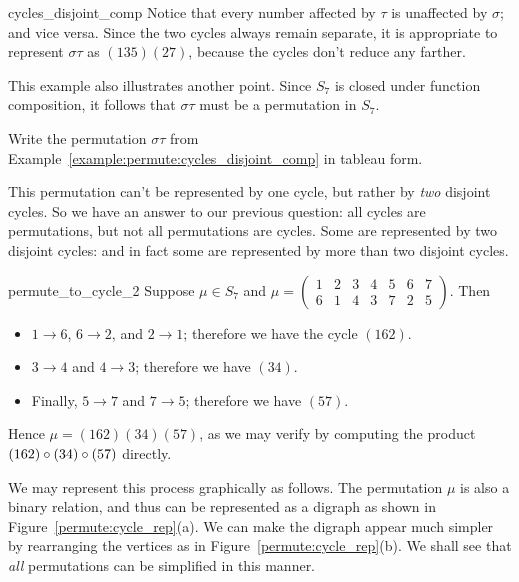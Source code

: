 \begin{example}{cycles_disjoint_comp}
Notice that every number affected by $\tau$ is unaffected by $\sigma$; and vice versa. Since the two cycles always  remain separate, it is appropriate to represent $\sigma \tau$ as $(135)(27)$, because the cycles don't reduce any farther.
\end{example}

This example also illustrates another point.  Since $S_7$ is closed under function composition, it follows that $\sigma \tau$ must be a permutation in $S_7$.

\begin{exercise}{}
Write the permutation $\sigma \tau$ from Example~\ref{example:permute:cycles_disjoint_comp} in tableau form.
\end{exercise}

This permutation can't be represented by one cycle, but rather by \emph{two} disjoint cycles.  So we have an answer to our previous question: all cycles are permutations, but not all permutations are cycles.  Some are represented by two disjoint cycles: and in fact some are represented by more than two disjoint cycles.

\begin{example}{permute_to_cycle_2}
Suppose $\mu \in S_7$ and $\mu = \begin{pmatrix} 1 & 2 & 3 & 4 & 5 & 6 & 7 \\ 6 & 1 & 4 & 3 & 7 & 2 & 5 \end{pmatrix}$.  Then
\begin{itemize}
\item
$1 \to 6$, $6 \to 2$, and $2 \to 1$;  therefore we have the cycle $(162)$.
\item
$3 \to 4$ and $4 \to 3$; therefore we have $(34)$. 
\item
Finally, $5 \to 7$ and $7 \to 5$; therefore we have $(57)$. 
\end{itemize}

\noindent
Hence $\mu = (162)(34)(57)$, as we may verify by computing the product $(162)\circ (34)\circ (57)$ directly.

We may represent this process graphically as follows. The permutation $\mu$ is also a binary relation, and thus can be represented as a digraph as shown in Figure~\ref{permute:cycle_rep}(a). We can make the digraph appear much simpler by rearranging the vertices as in Figure~\ref{permute:cycle_rep}(b). We shall see that \emph{all} permutations can be simplified in this manner.
\end{example}


